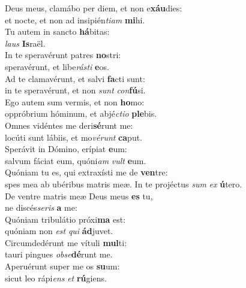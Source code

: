 \evenverse Deus meus, clamábo per diem, et non e\textbf{xáu}dies:~\*\\
\evenverse et nocte, et non ad insipién\textit{ti}\textit{am} \textbf{mi}hi.\\
\oddverse Tu autem in sancto \textbf{há}bitas:~\*\\
\oddverse \textit{laus} \textbf{Is}raël.\\
\evenverse In te speravérunt patres \textbf{no}stri:~\*\\
\evenverse speravérunt, et libe\textit{rá}\textit{sti} \textbf{e}os.\\
\oddverse Ad te clamavérunt, et salvi \textbf{fa}cti sunt:~\*\\
\oddverse in te speravérunt, et non \textit{sunt} \textit{con}\textbf{fú}si.\\
\evenverse Ego autem sum vermis, et non \textbf{ho}mo:~\*\\
\evenverse oppróbrium hóminum, et abjé\textit{cti}\textit{o} \textbf{ple}bis.\\
\oddverse Omnes vidéntes me deri\textbf{sé}runt me:~\*\\
\oddverse locúti sunt lábiis, et mo\textit{vé}\textit{runt} \textbf{ca}put.\\
\evenverse Sperávit in Dómino, erípiat \textbf{e}um:~\*\\
\evenverse salvum fáciat eum, quóni\textit{am} \textit{vult} \textbf{e}um.\\
\oddverse Quóniam tu es, qui extraxísti me de \textbf{ven}tre:~\*\\
\oddverse spes mea ab ubéribus matris meæ. In te projéctus \textit{sum} \textit{ex} \textbf{ú}tero.\\
\evenverse De ventre matris meæ Deus meus \textbf{es} tu,~\*\\
\evenverse ne discés\textit{se}\textit{ris} \textbf{a} me:\\
\oddverse Quóniam tribulátio próxi\textbf{ma} est:~\*\\
\oddverse quóniam non \textit{est} \textit{qui} \textbf{ád}juvet.\\
\evenverse Circumdedérunt me vítuli \textbf{mul}ti:~\*\\
\evenverse tauri pingues \textit{ob}\textit{se}\textbf{dé}runt me.\\
\oddverse Aperuérunt super me os \textbf{su}um:~\*\\
\oddverse sicut leo rápi\textit{ens} \textit{et} \textbf{rú}giens.\\

